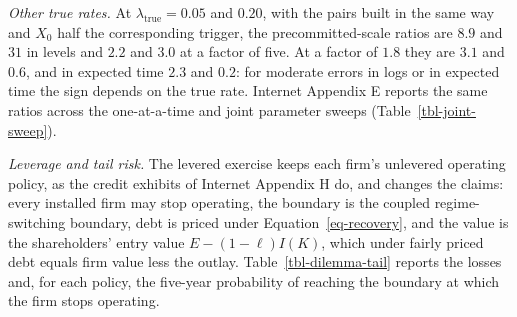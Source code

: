 \documentclass[
  11pt,
  letterpaper,
]{scrartcl}
\begin{document}
\emph{Other true rates.} At \(\lambda_{\text{true}} = 0.05\) and
\(0.20\), with the pairs built in the same way and \(X_0\) half the
corresponding trigger, the precommitted-scale ratios are \(8.9\) and
\(31\) in levels and \(2.2\) and \(3.0\) at a factor of five. At a
factor of \(1.8\) they are \(3.1\) and \(0.6\), and in expected time
\(2.3\) and \(0.2\): for moderate errors in logs or in expected time the
sign depends on the true rate. Internet Appendix E reports the same
ratios across the one-at-a-time and joint parameter sweeps
(Table~\ref{tbl-joint-sweep}).

\emph{Leverage and tail risk.} The levered exercise keeps each firm's
unlevered operating policy, as the credit exhibits of Internet Appendix
H do, and changes the claims: every installed firm may stop operating,
the boundary is the coupled regime-switching boundary, debt is priced
under Equation~\ref{eq-recovery}, and the value is the shareholders'
entry value \(E - (1-\ell) I(K)\), which under fairly priced debt equals
firm value less the outlay. Table~\ref{tbl-dilemma-tail} reports the
losses and, for each policy, the five-year probability of reaching the
boundary at which the firm stops operating.
\end{document}

